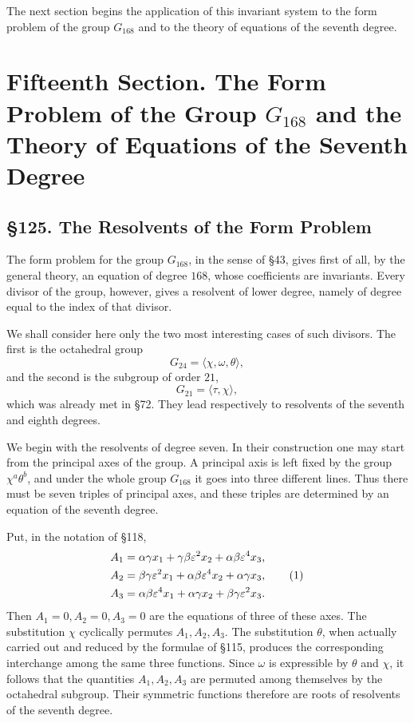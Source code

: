 \documentclass[11pt,a4paper]{book}
\newcommand{\webersection}[2]{\clearpage\section*{\S #1. #2}}
\newcommand{\booktitle}[1]{\clearpage\chapter*{#1}}
\newcommand{\eps}{\varepsilon}
\begin{document}
The next section begins the application of this invariant system to the form problem of the group \(G_{168}\) and to the theory of equations of the seventh degree.

\booktitle{Fifteenth Section. The Form Problem of the Group \(G_{168}\) and the Theory of Equations of the Seventh Degree}

\webersection{125}{The Resolvents of the Form Problem}

The form problem for the group \(G_{168}\), in the sense of \S 43, gives first of all, by the general theory, an equation of degree \(168\), whose coefficients are invariants.  Every divisor of the group, however, gives a resolvent of lower degree, namely of degree equal to the index of that divisor.

We shall consider here only the two most interesting cases of such divisors.  The first is the octahedral group
\[
 G_{24}=\langle \chi,\omega,\theta\rangle,
\]
and the second is the subgroup of order \(21\),
\[
 G_{21}=\langle \tau,\chi\rangle,
\]
which was already met in \S 72.  They lead respectively to resolvents of the seventh and eighth degrees.

We begin with the resolvents of degree seven.  In their construction one may start from the principal axes of the group.  A principal axis is left fixed by the group \(\chi^a\theta^b\), and under the whole group \(G_{168}\) it goes into three different lines.  Thus there must be seven triples of principal axes, and these triples are determined by an equation of the seventh degree.

Put, in the notation of \S 118,
\begin{align}
 A_1&=\alpha\gamma x_1+\gamma\beta\eps^2x_2+\alpha\beta\eps^4x_3,\notag\\
 A_2&=\beta\gamma\eps^2x_1+\alpha\beta\eps^4x_2+\alpha\gamma x_3,\tag{1}\\
 A_3&=\alpha\beta\eps^4x_1+\alpha\gamma x_2+\beta\gamma\eps^2x_3.\notag
\end{align}
Then \(A_1=0,A_2=0,A_3=0\) are the equations of three of these axes.  The substitution \(\chi\) cyclically permutes \(A_1,A_2,A_3\).  The substitution \(\theta\), when actually carried out and reduced by the formulae of \S 115, produces the corresponding interchange among the same three functions.  Since \(\omega\) is expressible by \(\theta\) and \(\chi\), it follows that the quantities \(A_1,A_2,A_3\) are permuted among themselves by the octahedral subgroup.  Their symmetric functions therefore are roots of resolvents of the seventh degree.
\end{document}
